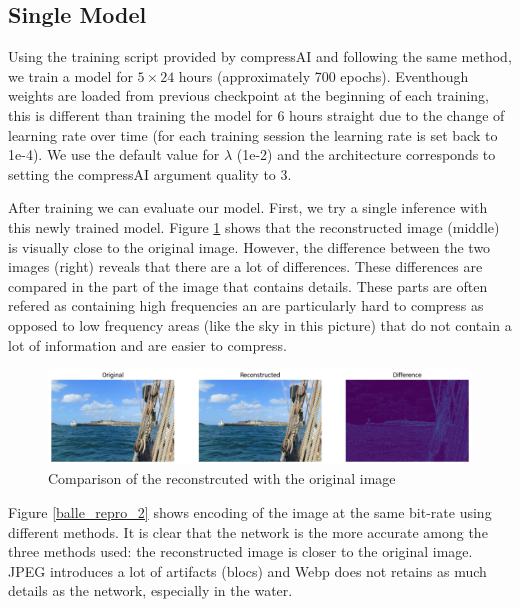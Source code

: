 \subsection{Single Model}
Using the training script provided by compressAI and following the same method, we train a model for \(5 \times 24\) hours (approximately 700 epochs). Eventhough weights are loaded from previous checkpoint at the beginning of each training, this is different than training the model for 6 hours straight due to the change of learning rate over time (for each training session the learning rate is set back to 1e-4). We use the default value for \(\lambda\) (1e-2) and the architecture corresponds to setting the compressAI argument \textsf{quality} to 3.

After training we can evaluate our model. First, we try a single inference with this newly trained model. Figure \ref{balle_repro_1} shows that the reconstructed image (middle) is visually close to the original image. However, the difference between the two images (right) reveals that there are a lot of differences. These differences are compared in the part of the image that contains details. These parts are often refered as containing high frequencies an are particularly hard to compress as opposed to low frequency areas (like the sky in this picture) that do not contain a lot of information and are easier to compress.

\begin{figure}
    \centering
    \includegraphics[width=15cm]{img/balle_repro_1.png}
    \caption{Comparison of the reconstrcuted with the original image}
    \label{balle_repro_1}
\end{figure}

Figure \ref{balle_repro_2} shows encoding of the image at the same bit-rate using different methods. It is clear that the network is the more accurate among the three methods used: the reconstructed image is closer to the original image. JPEG introduces a lot of artifacts (blocs) and Webp does not retains as much details as the network, especially in the water.

